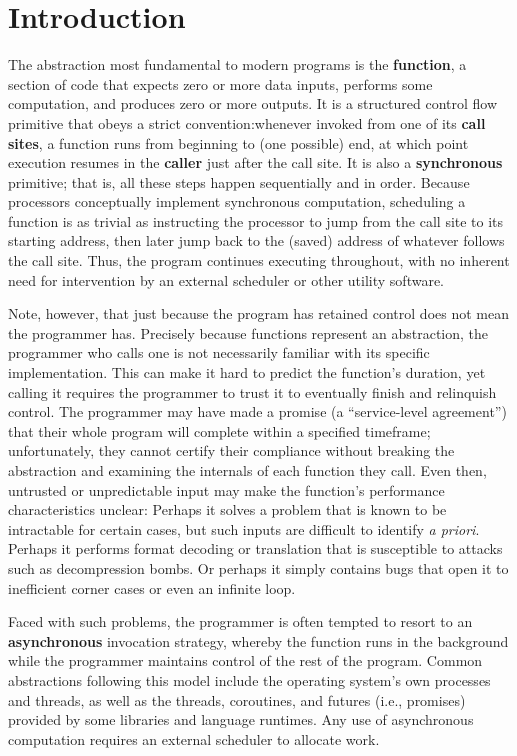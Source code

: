 \chapter{Introduction}

The abstraction most fundamental to modern programs is the \textbf{function}, a
section of code that expects zero or more data inputs, performs some computation, and
produces zero or more outputs.  It is a structured control flow primitive that obeys
a strict convention:\@ whenever invoked from one of its \textbf{call sites}, a
function runs from beginning to (one possible) end, at which point execution resumes
in the \textbf{caller} just after the call site.  It is also a \textbf{synchronous}
primitive; that is, all these steps happen sequentially and in order.  Because
processors conceptually implement synchronous computation, scheduling a function is
as trivial as instructing the processor to jump from the call site to its starting
address, then later jump back to the (saved) address of whatever follows the call
site.  Thus,
the program continues executing throughout, with no inherent need for intervention by
an external scheduler or other utility software.

Note, however, that just because the program has retained control does not mean the
programmer has.  Precisely because functions represent an abstraction, the programmer
who calls one is not necessarily familiar with its specific implementation.  This can
make it hard to predict the function's duration, yet calling it requires the
programmer to trust it to eventually finish and relinquish control.  The programmer
may have made a promise (a ``service-level agreement'') that their whole program
will complete within a specified timeframe; unfortunately, they cannot certify their
compliance without breaking the abstraction and examining the internals of each
function they call.  Even then, untrusted or unpredictable input may make the
function's performance characteristics unclear:  Perhaps it solves a problem that is
known to be intractable for certain cases, but such inputs are difficult to identify
\textit{a priori}.  Perhaps it performs format decoding or translation that is
susceptible to attacks such as decompression bombs.  Or perhaps it simply contains
bugs that open it to inefficient corner cases or even an infinite loop.

Faced with such problems, the programmer is often tempted to resort to an
\textbf{asynchronous} invocation strategy, whereby the function runs in the
background while the programmer maintains control of the rest of the program.  Common
abstractions following this model include the operating system's own processes and
threads, as well as the threads, coroutines, and futures (i.e., promises) provided by
some libraries and language runtimes.  Any use of asynchronous computation requires
an external scheduler to allocate work.

